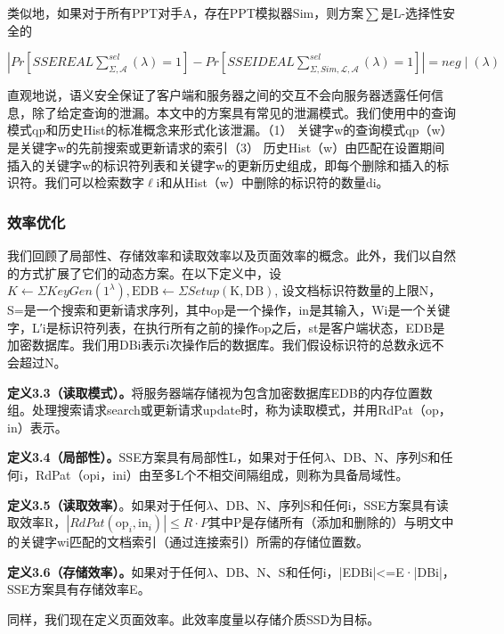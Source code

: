 \documentclass[UTF8]{article}
\begin{document}
类似地，如果对于所有PPT对手A，存在PPT模拟器Sim，则方案$\sum$是L-选择性安全的

$\left|{Pr}\left[{SSEREAL} \sum_{\Sigma, \mathcal{A}}^{ {sel }}(\lambda)=1\right]-{Pr}\left[{SSEIDEAL} \sum_{\Sigma, {Sim}, \mathcal{L}, \mathcal{A}}^{ {sel }}(\lambda)=1\right]\right|={neg} \mid(\lambda)$

直观地说，语义安全保证了客户端和服务器之间的交互不会向服务器透露任何信息，除了给定查询的泄漏。本文中的方案具有常见的泄漏模式。我们使用\cite{RaphaelBost2016ooFS}中的查询模式qp和历史Hist的标准概念来形式化该泄漏。（1） 关键字w的查询模式qp（w）是关键字w的先前搜索或更新请求的索引（3） 历史Hist（w）由匹配在设置期间插入的关键字w的标识符列表和关键字w的更新历史组成，即每个删除和插入的标识符。我们可以检索数字$\ell$i和从Hist（w）中删除的标识符的数量di。

\subsubsection{效率优化}

我们回顾了局部性、存储效率和读取效率\cite{DavidCash2014TheLO}以及页面效率\cite{AngleBossuat2021SSEAS}的概念。此外，我们以自然的方式扩展了它们的动态方案。在以下定义中，设$K\leftarrow\Sigma {KeyGen}\left(1^{\lambda}\right), \mathrm{EDB} \leftarrow \Sigma {Setup}(\mathrm{K}, \mathrm{DB})$, 设文档标识符数量的上限N，S=是一个搜索和更新请求序列，其中op是一个操作，in是其输入，Wi是一个关键字，L′i是标识符列表，在执行所有之前的操作op之后，st是客户端状态，EDB是加密数据库。我们用DBi表示i次操作后的数据库。我们假设标识符的总数永远不会超过N。

\textbf{定义3.3（读取模式）。}将服务器端存储视为包含加密数据库EDB的内存位置数组。处理搜索请求search或更新请求update时，称为读取模式，并用RdPat（op，in）表示。

\textbf{定义3.4（局部性）。}SSE方案具有局部性L，如果对于任何$\lambda$、DB、N、序列S和任何i，RdPat（opi，ini）由至多L个不相交间隔组成，则称为具备局域性。

\textbf{定义3.5（读取效率）}。如果对于任何$\lambda$、DB、N、序列S和任何i，SSE方案具有读取效率R，$\left|{RdPat}\left(\mathrm{op}_{i}, \mathrm{in}_{i}\right)\right| \leq R \cdot P$其中P是存储所有（添加和删除的）与明文中的关键字wi匹配的文档索引（通过连接索引）所需的存储位置数。

\textbf{定义3.6（存储效率）。}如果对于任何$\lambda$、DB、N、S和任何i，|EDBi|<=E·|DBi|，SSE方案具有存储效率E。

同样，我们现在定义页面效率。此效率度量以存储介质SSD为目标。
\end{document}
